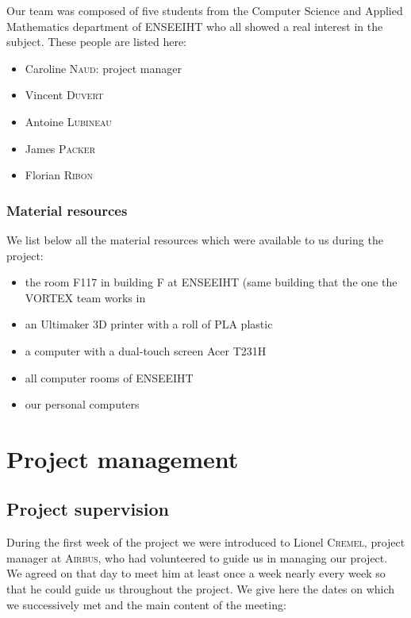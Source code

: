 \documentclass{report}
\begin{document}
	Our team was composed of five students from the Computer Science and Applied Mathematics department of ENSEEIHT who all showed a real interest in the subject. These people are listed here:

\begin{itemize}
\item Caroline \textsc{Naud}: project manager
\item Vincent \textsc{Duvert}
\item Antoine \textsc{Lubineau}
\item James \textsc{Packer}
\item Florian \textsc{Ribon}
\end{itemize}

\subsection{Material resources}

	We list below all the material resources which were available to us during the project:

\begin{itemize}
\item the room F117 in building F at ENSEEIHT (same building that the one the \textsc{VORTEX} team works in
\item an Ultimaker 3D printer with a roll of PLA plastic
\item a computer with a dual-touch screen Acer T231H
\item all computer rooms of ENSEEIHT
\item our personal computers
\end{itemize}

\chapter{Project management}

\section{Project supervision}

	During the first week of the project we were introduced to Lionel \textsc{Cremel}, project manager at \textsc{Airbus}, who had volunteered to guide us in managing our project. We agreed on that day to meet him at least once a week nearly every week so that he could guide us throughout the project. We give here the dates on which we successively met and the main content of the meeting:
	
\end{document}
